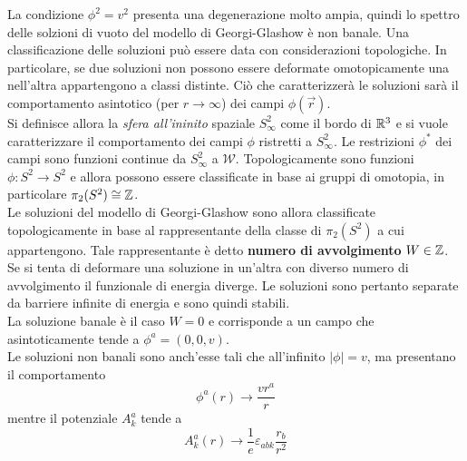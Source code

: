 La condizione $\phi^2 = v^2$ presenta una degenerazione molto ampia, quindi
lo spettro delle solzioni di vuoto del modello di Georgi-Glashow è non banale.
Una classificazione delle soluzioni può essere data con considerazioni topologiche.
In particolare, se due soluzioni non possono essere deformate omotopicamente una
nell'altra appartengono a classi distinte. Ciò che caratterizzerà le soluzioni
sarà il comportamento asintotico (per $r \to \infty$) dei campi $\phi(\vec r)$.\\

Si definisce allora la \emph{sfera all'ininito} spaziale $S^2_\infty$ come il bordo di
$\mathbb{R}^3$ e si vuole caratterizzare il comportamento dei campi $\phi$ ristretti a
$S^2_\infty$. Le restrizioni $\phi^*$ dei campi sono funzioni continue da $S^2_\infty$
a $\mathcal{W}$.
Topologicamente sono funzioni $\phi : S^2 \to S^2$ e allora possono essere
classificate in base ai gruppi di omotopia, in particolare $\pi_2(S^2) \cong \mathbb{Z}$.\\

Le soluzioni del modello di Georgi-Glashow sono allora classificate topologicamente
in base al rappresentante della classe di $\pi_2(S^2)$ a cui appartengono.
Tale rappresentante è detto \textbf{numero di avvolgimento} $W \in \mathbb{Z}$.\\

Se si tenta di deformare una soluzione in un'altra con diverso numero di avvolgimento
il funzionale di energia diverge. Le soluzioni sono pertanto separate da barriere
infinite di energia e sono quindi stabili.\\

La soluzione banale è il caso $W = 0$ e corrisponde a un campo che asintoticamente
tende a $\phi^a = (0,0,v)$.\\

Le soluzioni non banali sono anch'esse tali che all'infinito $|\phi| = v$, ma presentano
il comportamento
\begin{equation}\label{eq:nonabelianw1phi}
   \phi^a(r) \to \frac{vr^a}{r}
\end{equation}
mentre il potenziale $A_k^a$ tende a
\begin{equation}\label{eq:nonabelianw1A}
   A_k^a (r) \to \frac{1}{e} \varepsilon_{abk} \frac{r_b}{r^2}
\end{equation}

